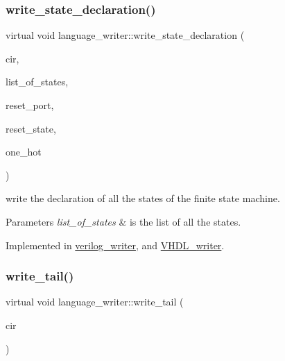 \subsubsection{\texorpdfstring{write\+\_\+state\+\_\+declaration()}{write\_state\_declaration()}}
{\footnotesize\ttfamily virtual void language\+\_\+writer\+::write\+\_\+state\+\_\+declaration (\begin{DoxyParamCaption}\item[{const \hyperlink{structural__objects_8hpp_a8ea5f8cc50ab8f4c31e2751074ff60b2}{structural\+\_\+object\+Ref} \&}]{cir,  }\item[{const std\+::list$<$ std\+::string $>$ \&}]{list\+\_\+of\+\_\+states,  }\item[{const std\+::string \&}]{reset\+\_\+port,  }\item[{const std\+::string \&}]{reset\+\_\+state,  }\item[{bool}]{one\+\_\+hot }\end{DoxyParamCaption})\hspace{0.3cm}{\ttfamily [pure virtual]}}



write the declaration of all the states of the finite state machine. 


\begin{DoxyParams}{Parameters}
{\em list\+\_\+of\+\_\+states} & is the list of all the states. \\
\hline
\end{DoxyParams}


Implemented in \hyperlink{classverilog__writer_a97913d24c2a3524e21363688c90f3eb0}{verilog\+\_\+writer}, and \hyperlink{structVHDL__writer_a0c98259dd9ea0a8ac551a7204e3a734f}{V\+H\+D\+L\+\_\+writer}.

\mbox{\label{classlanguage__writer_aa244ceb9a8c0033a75c5b885df4693c8}} 
\subsubsection{\texorpdfstring{write\+\_\+tail()}{write\_tail()}}
{\footnotesize\ttfamily virtual void language\+\_\+writer\+::write\+\_\+tail (\begin{DoxyParamCaption}\item[{const \hyperlink{structural__objects_8hpp_a8ea5f8cc50ab8f4c31e2751074ff60b2}{structural\+\_\+object\+Ref} \&}]{cir }\end{DoxyParamCaption})\hspace{0.3cm}{\ttfamily [pure virtual]}}



